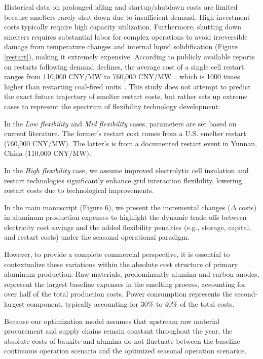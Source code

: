 \documentclass[preprint,12pt]{elsarticle}
\begin{document}
Historical data on prolonged idling and startup/shutdown costs are limited because smelters rarely shut down due to insufficient demand. High investment costs typically require high capacity utilization. Furthermore, shutting down smelters requires substantial labor for complex operations to avoid irreversible damage from temperature changes and internal liquid solidification (Figure \ref{restart}), making it extremely expensive. According to publicly available reports on restarts following demand declines, the average cost of a single cell restart ranges from 110,000 CNY/MW to 760,000 CNY/MW~\citep{Hu2009, noauthor_high_2020,noauthor_alcoa_2021}, which is 1000 times higher than restarting coal-fired units~\citep{smith_analysis_2019}. This study does not attempt to predict the exact future trajectory of smelter restart costs, but rather sets up extreme cases to represent the spectrum of flexibility technology development:

In the \textit{Low flexibility} and \textit{Mid flexibility} cases, parameters are set based on current literature. The former's restart cost comes from a U.S. smelter restart (760,000 CNY/MW). The latter's is from a documented restart event in Yunnan, China (110,000 CNY/MW).

In the \textit{High flexibility} case, we assume improved electrolytic cell insulation and restart technologies significantly enhance grid interaction flexibility, lowering restart costs due to technological improvements.



In the main manuscript (Figure 6), we present the incremental changes ($\Delta$ costs) in aluminum production expenses to highlight the dynamic trade-offs between electricity cost savings and the added flexibility penalties (e.g., storage, capital, and restart costs) under the seasonal operational paradigm.

However, to provide a complete commercial perspective, it is essential to contextualize these variations within the absolute cost structure of primary aluminum production. Raw materials, predominantly alumina and carbon anodes, represent the largest baseline expenses in the smelting process, accounting for over half of the total production costs. Power consumption represents the second-largest component, typically accounting for 30\% to 40\% of the total costs.

Because our optimization model assumes that upstream raw material procurement and supply chains remain constant throughout the year, the absolute costs of bauxite and alumina do not fluctuate between the baseline continuous operation scenario and the optimized seasonal operation scenarios.
\end{document}
